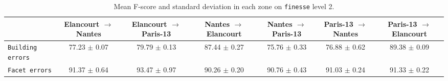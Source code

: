         \begin{sidewaystable}
            \footnotesize
            \centering
            \begin{tabular}{x{2cm} c c c c c c }
                \toprule
                & \textbf{Elancourt} $\rightarrow$ \textbf{Nantes} & \textbf{Elancourt} $\rightarrow$ \textbf{Paris-13} & \textbf{Nantes} $\rightarrow$ \textbf{Elancourt} & \textbf{Nantes} $\rightarrow$ \textbf{Paris-13} & \textbf{Paris-13} $\rightarrow$ \textbf{Nantes} & \textbf{Paris-13} $\rightarrow$ \textbf{Elancourt} \\
                \midrule
                \texttt{Building errors} & 77.23 $\pm$ 0.07 & 79.79 $\pm$ 0.13 & 87.44 $\pm$ 0.27 & 75.76 $\pm$ 0.33 & 76.88 $\pm$ 0.62 & 89.38 $\pm$ 0.09 \\
                \midrule
                \texttt{Facet errors} & 91.37 $\pm$ 0.64 & 93.47 $\pm$ 0.97 & 90.26 $\pm$ 0.20 & 90.76 $\pm$ 0.43 & 91.03 $\pm$ 0.24 & 91.33 $\pm$ 0.22 \\
                \bottomrule
            \end{tabular}
            \caption{
                \label{tab::f_score_transferability_f2} Mean F-score and standard deviation in each zone on \texttt{finesse} level 2.
            }
        \end{sidewaystable}
        
